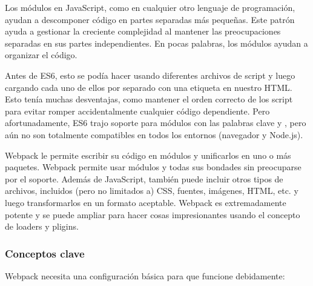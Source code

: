 Los módulos en JavaScript, como en cualquier otro lenguaje de programación, ayudan a descomponer código en partes separadas más pequeñas. Este patrón ayuda a gestionar la creciente complejidad al mantener las preocupaciones separadas en sus partes independientes. En pocas palabras, los módulos ayudan a organizar el código.
\vspace{0.8cm}

Antes de ES6, esto se podía hacer usando diferentes archivos de script y luego cargando cada uno de ellos por separado con una etiqueta  en nuestro HTML. Esto tenía muchas desventajas, como mantener el orden correcto de los script para evitar romper accidentalmente cualquier código dependiente. Pero afortunadamente, ES6 trajo soporte para módulos con las palabras clave  y , pero aún no son totalmente compatibles en todos los entornos (navegador y Node.js).
\vspace{0.8cm}

Webpack le permite escribir su código en módulos y unificarlos en uno o más paquetes. Webpack permite usar módulos y todas sus bondades sin preocuparse por el soporte. Además de JavaScript, también puede incluir otros tipos de archivos, incluidos (pero no limitados a) CSS, fuentes, imágenes, HTML, etc. y luego transformarlos en un formato aceptable. Webpack es extremadamente potente y se puede ampliar para hacer cosas impresionantes usando el concepto de loaders y pligins.
\vspace{0.8cm}

\subsubsection{Conceptos clave}
Webpack necesita una configuración básica para que funcione debidamente:

